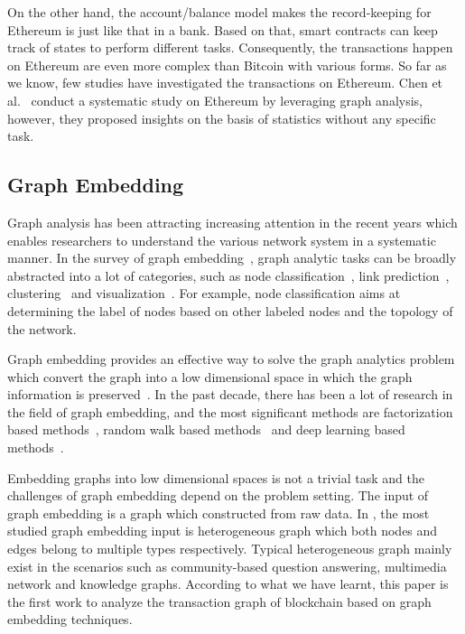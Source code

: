 On the other hand, the account/balance model makes the record-keeping for Ethereum is just like that in a bank. Based on that, smart contracts can keep track of states to perform different tasks. Consequently, the transactions happen on Ethereum are even more complex than Bitcoin with various forms. So far as we know, few studies have investigated the transactions on Ethereum. Chen et al.~\cite{chen2018infocom} conduct a systematic study on Ethereum by leveraging graph analysis, however, they proposed insights on the basis of statistics without any specific task. 


\subsection{Graph Embedding}
Graph analysis has been attracting increasing attention in the recent years which enables researchers to understand the various network system in a systematic manner. In the survey of graph embedding~\cite{cai2018comprehensive}, graph analytic tasks can be broadly abstracted into a lot of categories, such as node classification~\cite{bhagat2011node}, link prediction~\cite{liben2007link}, clustering~\cite{ding2001min} and visualization~\cite{maaten2008visualizing}. For example, node classification aims at determining the label of nodes based on other labeled nodes and the topology of the network.

Graph embedding provides an effective way to solve the graph analytics problem which convert the graph into a low dimensional space in which the graph information is preserved~\cite{hamilton2017representation}. In the past decade, there has been a lot of research in the field of graph embedding, and the most significant methods are factorization based methods~\cite{ahmed2013distributed,belkin2002laplacian,roweis2000nonlinear}, random walk based methods~\cite{perozzi2014deepwalk,grover2016node2vec} and deep learning based methods~\cite{wang2016structural,kipf2016semi}. 

Embedding graphs into low dimensional spaces is not a trivial task and the challenges of graph embedding depend on the problem setting. The input of graph embedding is a graph which constructed from raw data. In \cite{goyal2018graph}, the most studied graph embedding input is heterogeneous graph which both nodes and edges belong to multiple types respectively. Typical heterogeneous graph mainly exist in the scenarios such as community-based question answering, multimedia network and knowledge graphs. According to what we have learnt, this paper is the first work to analyze the transaction graph of blockchain based on graph embedding techniques.